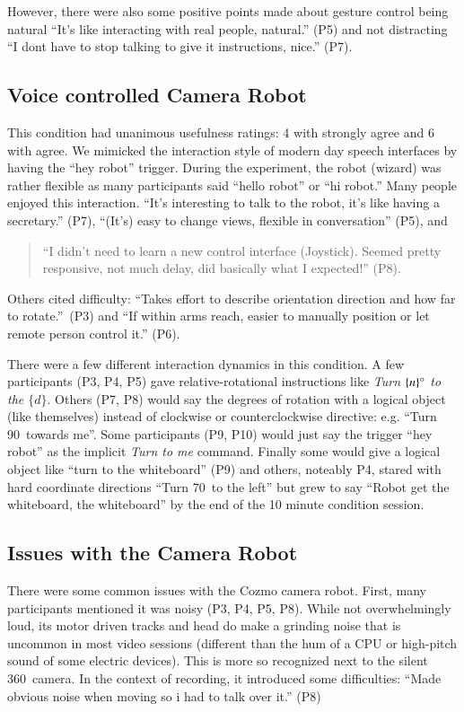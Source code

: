 \documentclass{tufte-handout}
\begin{document}
However, there were also some positive
points made about gesture control being natural ``It's like interacting
with real people, natural.'' (P5) and not distracting ``I dont have to
stop talking to give it instructions, nice.'' (P7).

\subsection{Voice controlled Camera Robot}
This condition had unanimous usefulness ratings: 4 with strongly agree
and 6 with agree.  We mimicked the interaction style of modern day
speech interfaces by having the ``hey robot'' trigger. During the
experiment, the robot (wizard) was rather flexible as many
participants said ``hello robot'' or ``hi robot.'' Many people enjoyed
this interaction.  ``It's interesting to talk to the robot, it's like
having a secretary.'' (P7), ``(It's) easy to change views, flexible in
conversation'' (P5), and
\begin{quote}
  ``I didn't need to learn a new control interface (Joystick). Seemed
  pretty responsive, not much delay, did basically what I expected!''
  (P8).
\end{quote}
Others cited difficulty: ``Takes effort to describe orientation
direction and how far to rotate.''~(P3) and ``If within arms reach,
easier to manually position or let remote person control it.'' (P6).

There were a few different interaction dynamics in this condition.  A
few participants (P3, P4, P5) gave relative-rotational instructions
like \textit{Turn $\{n\}\degree$ to the $\{d\}$}.  Others (P7, P8)
would say the degrees of rotation with a logical object (like
themselves) instead of clockwise or counterclockwise directive:
e.g. ``Turn 90\textdegree\ towards me''. Some participants (P9, P10)
would just say the trigger ``hey robot'' as the implicit \textit{Turn
  to me} command.  Finally some would give a logical object like
``turn to the whiteboard'' (P9) and others, noteably P4, stared with
hard coordinate directions ``Turn 70\textdegree\ to the left'' but
grew to say ``Robot get the whiteboard, the whiteboard'' by the end of
the 10 minute condition session.

\subsection{Issues with the Camera Robot}
There were some common issues with the Cozmo camera robot. First, many
participants mentioned it was noisy (P3, P4, P5, P8). While not
overwhelmingly loud, its motor driven tracks and head do make a
grinding noise that is uncommon in most video sessions (different than
the hum of a CPU or high-pitch sound of some electric devices). This
is more so recognized next to the silent 360\textdegree\ camera.  In
the context of recording, it introduced some difficulties: ``Made
obvious noise when moving so i had to talk over it.'' (P8)
\end{document}
